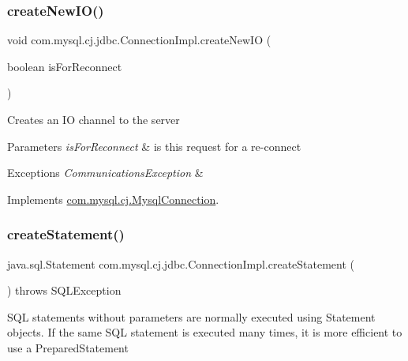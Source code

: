 \subsubsection{\texorpdfstring{create\+New\+I\+O()}{createNewIO()}}
{\footnotesize\ttfamily void com.\+mysql.\+cj.\+jdbc.\+Connection\+Impl.\+create\+New\+IO (\begin{DoxyParamCaption}\item[{boolean}]{is\+For\+Reconnect }\end{DoxyParamCaption})}

Creates an IO channel to the server


\begin{DoxyParams}{Parameters}
{\em is\+For\+Reconnect} & is this request for a re-\/connect \\
\hline
\end{DoxyParams}

\begin{DoxyExceptions}{Exceptions}
{\em Communications\+Exception} & \\
\hline
\end{DoxyExceptions}


Implements \mbox{\hyperlink{interfacecom_1_1mysql_1_1cj_1_1_mysql_connection}{com.\+mysql.\+cj.\+Mysql\+Connection}}.

\mbox{\label{classcom_1_1mysql_1_1cj_1_1jdbc_1_1_connection_impl_ac07000b85a6e8197ac8ca945bc44bbec}} 
\subsubsection{\texorpdfstring{create\+Statement()}{createStatement()}\hspace{0.1cm}{\footnotesize\ttfamily [1/2]}}
{\footnotesize\ttfamily java.\+sql.\+Statement com.\+mysql.\+cj.\+jdbc.\+Connection\+Impl.\+create\+Statement (\begin{DoxyParamCaption}{ }\end{DoxyParamCaption}) throws S\+Q\+L\+Exception}

S\+QL statements without parameters are normally executed using Statement objects. If the same S\+QL statement is executed many times, it is more efficient to use a Prepared\+Statement

